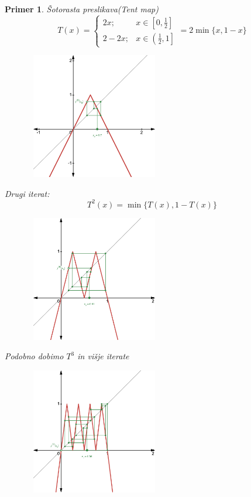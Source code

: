 \documentclass{article}
\newtheorem{primer}{Primer}
\begin{document}
\begin{primer}
Šotorasta preslikava(Tent map)
$$
T(x)= \begin{cases}2 x ; & x \in\left[0, \frac{1}{2}\right] \\ 2-2 x ; & x \in\left(\frac{1}{2}, 1\right]\end{cases} =2\min\{x, 1 - x\} 
$$
\begin{figure}[h!]
    \begin{centering}
        \includegraphics[width=6cm, height=5.5cm]{Grafi/cobweb8.png}
    \end{centering}
\end{figure}   

Drugi iterat: 
$$T^2(x) = \min\{T(x), 1 - T(x)\}$$

\begin{figure}[h!]
    \begin{centering}
        \includegraphics[width=6cm, height=5.5cm]{Grafi/cobweb9.png}
    \end{centering}
\end{figure} 
\newpage
Podobno dobimo $T^3$ in višje iterate 

\begin{figure}[h!]
    \begin{centering}
        \includegraphics[width=6cm, height=5.5cm]{Grafi/cobweb10.png}
    \end{centering}
\end{figure} 



\end{primer}
\end{document}
